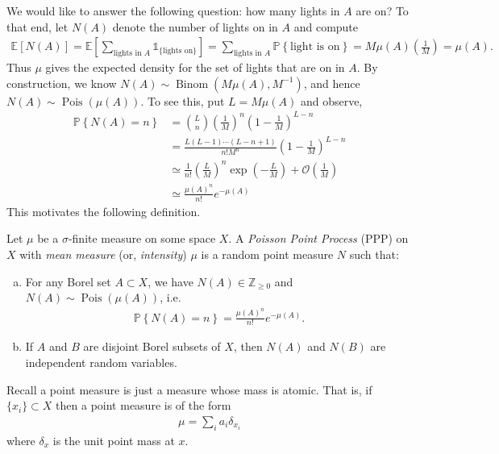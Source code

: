 \documentclass[11pt]{article}
\begin{document}
We would like to answer the following question: how many lights in $A$ are on? To that end, let $N(A)$ denote the number of lights on in $A$ and compute
\begin{align}
	\mathbb{E}\left[ N(A) \right] = \mathbb{E} \left[ \sum_{\text{lights in }A} \mathds{1}_{\{\text{lights on}\}} \right]
	= \sum_{\text{lights in }A} \mathbb{P}\left\{ \text{light is on} \right\}
		= M \mu(A) \left(\frac{1}{M}\right)
		= \mu(A).
\end{align}
Thus $\mu$ gives the expected density for the set of lights that are on in $A$. By construction, we know $N(A) \sim \operatorname{Binom}\left(M\mu(A),M^{-1}\right)$, and hence $N(A) \sim \operatorname{Pois}(\mu(A))$. To see this, put $L = M\mu(A)$ and observe,
\begin{align}
	\mathbb{P}\left\{N(A) = n \right\} &= \binom{L}{n}\left(\frac{1}{M}\right)^n\left(1 - \frac{1}{M}\right)^{L-n}\\
	&= \frac{L(L-1)\cdots (L-n+1)}{n! M^n} \left( 1 - \frac{1}{M} \right)^{L-n}\\
	&\simeq \frac{1}{n!}\left( \frac{L}{M} \right)^n \exp\left( -\frac{L}{M} \right) + \mathcal{O}\left( \frac{1}{M} \right)\\
	&\simeq \frac{\mu(A)^n}{n!} e^{-\mu(A)}
\end{align}  
This motivates the following definition.
\begin{definition}
	Let $\mu$ be a $\sigma$-finite measure on some space $X$. A \emph{Poisson Point Process} (PPP) on $X$ with \emph{mean measure} (or, \emph{intensity}) $\mu$ is a random point measure $N$ such that:
	\begin{enumerate}[(a)]
		\item For any Borel set $A\subset X$, we have $N(A) \in \mathbb{Z}_{\geq 0}$ and $N(A) \sim \operatorname{Pois}(\mu(A))$, i.e.
		\begin{align}\label{eq:ppp}
			\mathbb{P}\left\{ N(A) = n \right\} = \frac{\mu(A)^n}{n!} e^{-\mu(A)}.
		\end{align}
		\item If $A$ and $B$ are disjoint Borel subsets of $X$, then $N(A)$ and $N(B)$ are independent random variables.
	\end{enumerate}
\end{definition}
Recall a point measure is just a measure whose mass is atomic. That is, if $\{x_i\}\subset X$ then a point measure is of the form
\begin{align}
	\mu = \sum_i a_i \delta_{x_i}
\end{align}
where $\delta_x$ is the unit point mass at $x$.
\end{document}

